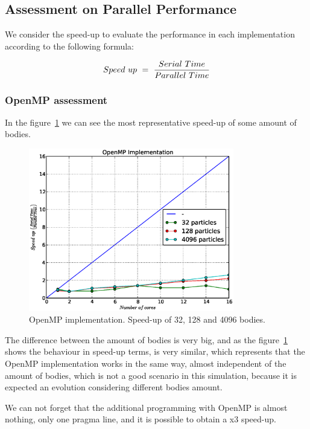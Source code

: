 \subsection{Assessment on Parallel Performance}

We consider the speed-up to evaluate the performance
in each implementation according to the following formula:

\begin{equation}
Speed\  up\ =\ \frac{Serial\ Time}{Parallel\ Time} \\
\end{equation}

\subsubsection{OpenMP assessment}

In the figure~\ref{fig:openmp} we can see the most representative speed-up of some
amount of bodies.

\begin{figure}[h!t]
    \centering
    \includegraphics[width=0.8\textwidth]{images/openmp.eps}
    \caption{OpenMP implementation. Speed-up of 32, 128 and 4096 bodies.}
    \label{fig:openmp}
\end{figure}

The difference between the amount of bodies is very big,
and as the figure~\ref{fig:openmp} shows the behaviour in speed-up terms,
is very similar, which represents that the OpenMP implementation works
in the same way, almost independent of the amount of bodies, which is not
a good scenario in this simulation, because it is expected an evolution
considering different bodies amount.

We can not forget that the additional programming with OpenMP
is almost nothing, only one pragma line, and it is possible to obtain
a x3 speed-up.

